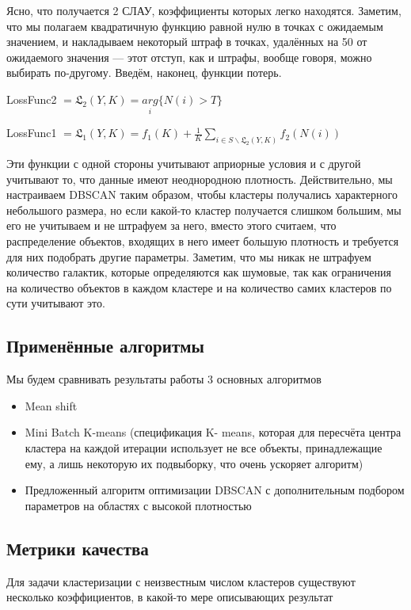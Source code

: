 \documentclass[12pt,fleqn]{article}
\begin{document}
Ясно, что получается 2 СЛАУ, коэффициенты которых легко находятся. Заметим, что мы полагаем квадратичную функцию равной нулю в точках с ожидаемым значением, и накладываем некоторый штраф в точках, удалённых на 50 от ожидаемого значения --- этот отступ, как и штрафы, вообще говоря, можно выбирать по-другому. Введём, наконец, функции потерь.

LossFunc2 $=\mathfrak{L}_2(Y, K) = \underset{i}{arg}\{N(i)>T\}$

LossFunc1 $= \mathfrak{L}_1(Y, K) = f_1(K) + \frac{1}{K} \sum_{i \in S\backslash \mathfrak{L}_2(Y, K)}^{}f_2(N(i))$

Эти функции с одной стороны учитывают априорные условия и с другой учитывают то, что данные имеют неоднородною плотность. Действительно, мы настраиваем DBSCAN таким образом, чтобы кластеры получались характерного небольшого размера, но если какой-то кластер получается слишком большим, мы его не учитываем и не штрафуем за него, вместо этого считаем, что распределение объектов, входящих в него имеет большую плотность и требуется для них подобрать другие параметры. Заметим, что мы никак не штрафуем количество галактик, которые определяются как шумовые, так как ограничения на количество объектов в каждом кластере и на количество самих кластеров по сути учитывают это.


\subsection{Применённые алгоритмы}

Мы будем сравнивать результаты работы 3 основных алгоритмов
\begin{itemize}
    \item
        Mean shift
    \item
        Mini Batch K-means (спецификация K- means, которая для пересчёта центра кластера на каждой итерации использует не все объекты, принадлежащие ему, а лишь некоторую их подвыборку, что очень ускоряет алгоритм)
    \item
        Предложенный алгоритм оптимизации DBSCAN с дополнительным подбором параметров на областях с высокой плотностью
\end{itemize}

\subsection{Метрики качества}
Для задачи кластеризации с неизвестным числом кластеров существуют несколько коэффициентов, в какой-то мере описывающих результат
\end{document}

